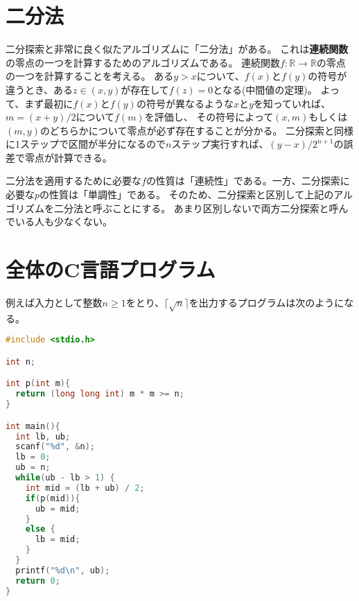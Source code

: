 \documentclass[a4paper,twoside,onecolumn,openany,article,10pt]{memoir}
\theoremstyle{remark}
\begin{document}
\section{二分法}
二分探索と非常に良く似たアルゴリズムに「二分法」がある。
これは\textbf{連続関数}の零点の一つを計算するためのアルゴリズムである。
連続関数$f\colon\mathbb{R}\to\mathbb{R}$の零点の一つを計算することを考える。
ある$y>x$について、$f(x)$と$f(y)$の符号が違うとき、ある$z\in(x,y)$が存在して$f(z)=0$となる(中間値の定理)。
よって、まず最初に$f(x)$と$f(y)$の符号が異なるような$x$と$y$を知っていれば、$m=(x+y)/2$について$f(m)$を評価し、
その符号によって$(x, m)$もしくは$(m, y)$のどちらかについて零点が必ず存在することが分かる。
二分探索と同様に1ステップで区間が半分になるので$n$ステップ実行すれば、$(y-x)/2^{n+1}$の誤差で零点が計算できる。

二分法を適用するために必要な$f$の性質は「連続性」である。一方、二分探索に必要な$p$の性質は「単調性」である。
そのため、二分探索と区別して上記のアルゴリズムを二分法と呼ぶことにする。
あまり区別しないで両方二分探索と呼んでいる人も少なくない。


\section{全体のC言語プログラム}

例えば入力として整数$n\ge 1$をとり、$\lceil\sqrt{n}\rceil$を出力するプログラムは次のようになる。

\begin{minipage}{\linewidth}
\begin{lstlisting}[basicstyle=\ttfamily\normalsize,showstringspaces=false,language=C,frame=single]
#include <stdio.h>

int n;

int p(int m){
  return (long long int) m * m >= n;
}

int main(){
  int lb, ub;
  scanf("%d", &n);
  lb = 0;
  ub = n;
  while(ub - lb > 1) {
    int mid = (lb + ub) / 2;
    if(p(mid)){
      ub = mid;
    }
    else {
      lb = mid;
    }
  }
  printf("%d\n", ub);
  return 0;
}
\end{lstlisting}
\end{minipage}
\end{document}
